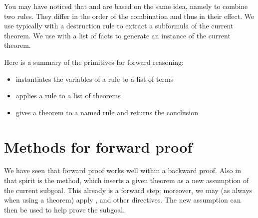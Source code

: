 You may have noticed that {} and {} are based on 
the same idea, namely to combine two rules.  They differ in the
order of the combination and thus in their effect.  We use 
typically with a destruction rule to extract a subformula of the current
theorem.  We use  with a list of facts to generate an instance of
the current theorem.


Here is a summary of the primitives for forward reasoning:
\begin{itemize}
\item {} instantiates the variables of a rule to a list of terms
\item {} applies a rule to a list of theorems
\item {} gives a theorem to a named rule and returns the
conclusion 
\end{itemize}


\section{Methods for forward proof}

We have seen that forward proof works well within a backward 
proof.  Also in that spirit is the  method, which inserts a
given theorem as a new assumption of the current subgoal.  This already
is a forward step; moreover, we may (as always when using a theorem) apply
{}, {} and other directives.  The new assumption can then
be used to help prove the subgoal.

